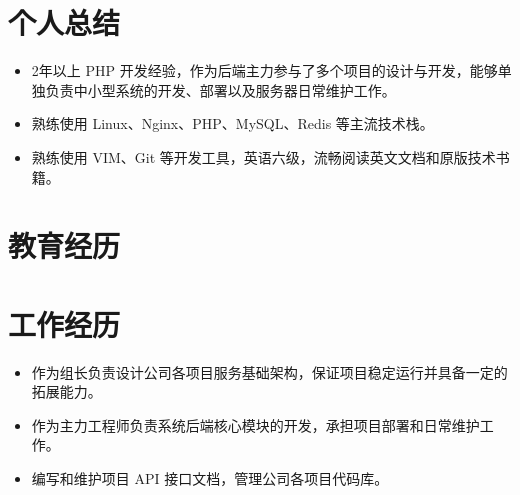 \documentclass{resume}
\begin{document}

	\section{个人总结}
	\begin{itemize}
		\item 2年以上 PHP 开发经验，作为后端主力参与了多个项目的设计与开发，能够单独负责中小型系统的开发、部署以及服务器日常维护工作。
		\item 熟练使用 Linux、Nginx、PHP、MySQL、Redis 等主流技术栈。
		\item 熟练使用 VIM、Git 等开发工具，英语六级，流畅阅读英文文档和原版技术书籍。
	\end{itemize}

	\section{教育经历}

	\section{工作经历}	
	\begin{itemize}
		\item 作为组长负责设计公司各项目服务基础架构，保证项目稳定运行并具备一定的拓展能力。
		\item 作为主力工程师负责系统后端核心模块的开发，承担项目部署和日常维护工作。
		\item 编写和维护项目 API 接口文档，管理公司各项目代码库。
	\end{itemize}
		
\end{document}
